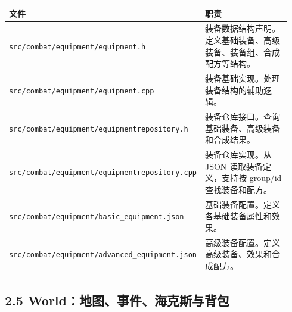 \documentclass[UTF8,10pt]{ctexart}
\begin{document}
{\small
\begin{longtable}{p{0.34\linewidth}p{0.60\linewidth}}
\toprule
\textbf{文件} & \textbf{职责} \\
\midrule
\texttt{src/\allowbreak{}combat/\allowbreak{}equipment/\allowbreak{}equipment.\allowbreak{}h} & 装备数据结构声明。定义基础装备、高级装备、装备组、合成配方等结构。 \\
\texttt{src/\allowbreak{}combat/\allowbreak{}equipment/\allowbreak{}equipment.\allowbreak{}cpp} & 装备基础实现。处理装备结构的辅助逻辑。 \\
\texttt{src/\allowbreak{}combat/\allowbreak{}equipment/\allowbreak{}equipmentrepository.\allowbreak{}h} & 装备仓库接口。查询基础装备、高级装备和合成结果。 \\
\texttt{src/\allowbreak{}combat/\allowbreak{}equipment/\allowbreak{}equipmentrepository.\allowbreak{}cpp} & 装备仓库实现。从 JSON 读取装备定义，支持按 group/id 查找装备和配方。 \\
\texttt{src/\allowbreak{}combat/\allowbreak{}equipment/\allowbreak{}basic\_\allowbreak{}equipment.\allowbreak{}json} & 基础装备配置。定义各基础装备属性和效果。 \\
\texttt{src/\allowbreak{}combat/\allowbreak{}equipment/\allowbreak{}advanced\_\allowbreak{}equipment.\allowbreak{}json} & 高级装备配置。定义高级装备、效果和合成配方。 \\
\bottomrule
\end{longtable}
}

\subsection*{2.5 World：地图、事件、海克斯与背包}
\end{document}
